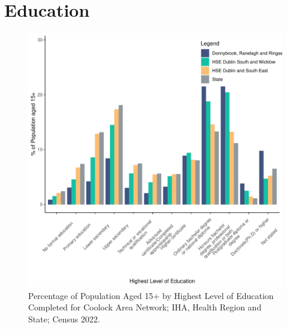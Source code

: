 \documentclass{article}
\begin{document}
\section{Education}\label{sect:Edu}
\begin{figure}[H]
	\centering
	\includegraphics[width = 120mm]{../figures/EduED.pdf}
	\caption{Percentage of Population Aged 15+ by Highest Level of Education Completed for Coolock Area Network; IHA, Health Region and State; Census 2022.}
	\label{fig:vbnv}
	\end{figure}
\end{document}
